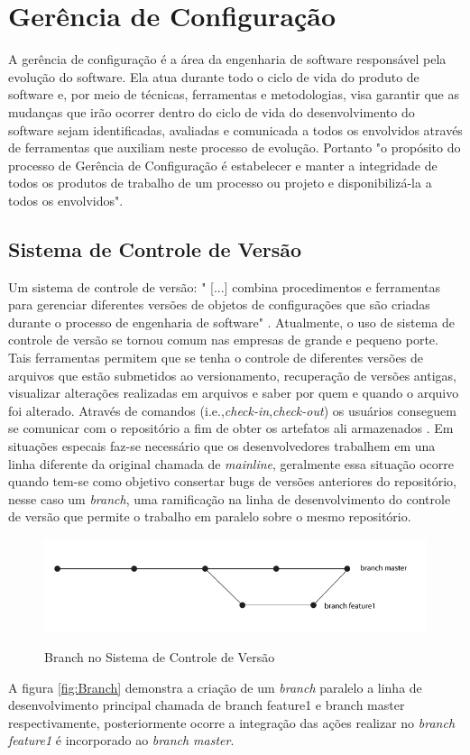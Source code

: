 \section{Gerência de Configuração}
A gerência de configuração é a área da engenharia de software responsável pela evolução do software. Ela atua durante todo o ciclo de vida do produto de software e, por meio de técnicas, ferramentas e metodologias, visa garantir que as mudanças que irão ocorrer dentro do ciclo de vida do desenvolvimento do software sejam identificadas, avaliadas e comunicada a todos os envolvidos através de ferramentas que auxiliam neste processo de evolução.
Portanto "o propósito do processo de Gerência de Configuração é estabelecer e manter a integridade de todos os produtos de trabalho de um processo ou projeto e disponibilizá-la a todos os envolvidos"\space\cite{mpsbr}.
\subsection{Sistema de Controle de Versão}
Um sistema de controle de versão: "	[...] combina procedimentos e ferramentas para gerenciar diferentes versões de objetos de configurações que são criadas durante o processo de engenharia de software" \cite[p.~927]{pressman2010}.
Atualmente, o uso de sistema de controle de versão se tornou comum nas empresas de grande e pequeno porte. Tais ferramentas permitem que se tenha o controle de diferentes versões de arquivos que estão submetidos ao versionamento, recuperação de versões antigas, visualizar alterações realizadas em arquivos e saber por quem e quando o arquivo foi alterado. Através de comandos (i.e.,\textit{check-in},\textit{check-out}) os usuários conseguem se comunicar com o repositório a fim de obter os artefatos ali armazenados \cite{gleiph2011}. Em situações especais faz-se necessário que os desenvolvedores trabalhem em una linha diferente da original chamada de \textit{mainline}, geralmente essa situação ocorre quando tem-se como objetivo consertar bugs de versões anteriores do repositório, nesse caso um \textit{branch}, uma ramificação na linha de desenvolvimento do controle de versão que permite o trabalho em paralelo sobre o mesmo repositório.
\begin{figure}[tbh]
\centering
\caption[Branch no Sistema de Controle de Versão]{Branch no Sistema de Controle de Versão}
\includegraphics[width=0.7\linewidth]{./images/branch}
\label{fig:Branch}
\end{figure}
A figura \autoref{fig:Branch} demonstra a criação de um \textit{branch} paralelo a linha de desenvolvimento principal chamada de branch feature1 e branch master respectivamente, posteriormente ocorre a integração das ações realizar no \textit{branch feature1} é incorporado ao \textit{branch master}.
